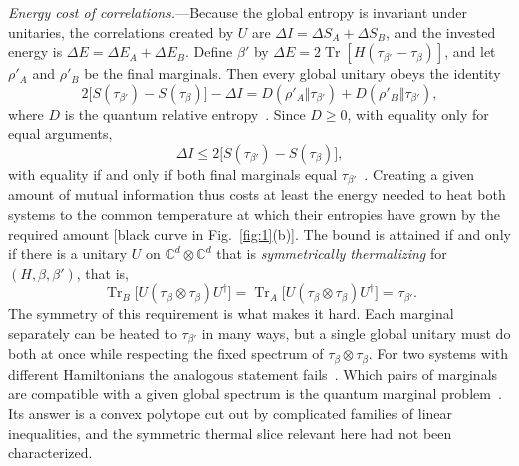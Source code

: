 \documentclass[aps,prl,reprint,superscriptaddress,amsmath,amssymb]{revtex4-2}
\newcommand{\Tr}{\operatorname{Tr}}
\newcommand{\C}{\mathbb{C}}
\begin{document}
\textit{Energy cost of correlations.}---Because the global entropy is invariant under unitaries, the correlations
created by $U$ are $\Delta I=\Delta S_A+\Delta S_B$, and the invested energy is $\Delta E=\Delta E_A+\Delta E_B$.
Define $\beta'$ by $\Delta E=2\Tr[H(\tau_{\beta'}-\tau_\beta)]$, and let $\rho'_A$ and $\rho'_B$ be the final
marginals. Then every global unitary obeys the identity
\begin{equation}\label{eq:identity}
2\bigl[S(\tau_{\beta'})-S(\tau_\beta)\bigr]-\Delta I=D(\rho'_A\Vert\tau_{\beta'})+D(\rho'_B\Vert\tau_{\beta'}),
\end{equation}
where $D$ is the quantum relative entropy~\cite{SM}. Since $D\ge0$, with equality only for equal arguments,
\begin{equation}\label{eq:bound}
\Delta I\le2\bigl[S(\tau_{\beta'})-S(\tau_\beta)\bigr],
\end{equation}
with equality if and only if both final marginals equal $\tau_{\beta'}$~\cite{Huber2015,Bakhshinezhad2019}. Creating a
given amount of mutual information thus costs at least the energy needed to heat both systems to the common
temperature at which their entropies have grown by the required amount [black curve in Fig.~\ref{fig:1}(b)]. The
bound is attained if and only if there is a unitary $U$ on $\C^d\otimes\C^d$ that is \emph{symmetrically
thermalizing} for $(H,\beta,\beta')$, that is,
\begin{equation}\label{eq:stu}
\Tr_B\bigl[U(\tau_\beta\otimes\tau_\beta)U^\dagger\bigr]=\Tr_A\bigl[U(\tau_\beta\otimes\tau_\beta)U^\dagger\bigr]
=\tau_{\beta'} .
\end{equation}
The symmetry of this requirement is what makes it hard. Each marginal separately can be heated to $\tau_{\beta'}$ in
many ways, but a single global unitary must do both at once while respecting the fixed spectrum of
$\tau_\beta\otimes\tau_\beta$. For two systems with different Hamiltonians the analogous statement
fails~\cite{Bakhshinezhad2019}. Which pairs of marginals are compatible with a given global spectrum is the quantum
marginal problem~\cite{Klyachko2004,Daftuar2005,Christandl2006}. Its answer is a convex polytope cut out by
complicated families of linear inequalities, and the symmetric thermal slice relevant here had not been characterized.
\end{document}
